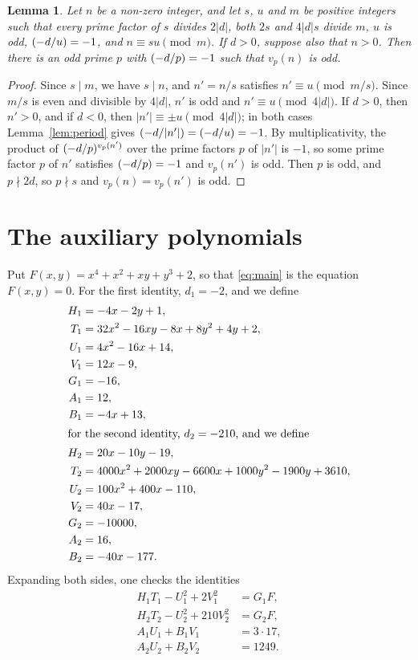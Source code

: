 \documentclass[11pt]{article}
\newtheorem{lemma}[theorem]{Lemma}
\newcommand{\leg}[2]{\mathchoice{\biggl(\dfrac{#1}{#2}\biggr)}{(#1/#2)}{(#1/#2)}{(#1/#2)}}
\begin{document}
\begin{lemma}\label{lem:odd}
Let $n$ be a non-zero integer, and let $s$, $u$ and $m$ be positive integers such that every prime factor of $s$ divides $2|d|$, both $2s$ and $4|d|s$ divide $m$, $u$ is odd, $\leg{-d}{u}=-1$, and $n\equiv su\pmod m$. If $d>0$, suppose also that $n>0$. Then there is an odd prime $p$ with $\leg{-d}{p}=-1$ such that $v_p(n)$ is odd.
\end{lemma}

\begin{proof}
Since $s\mid m$, we have $s\mid n$, and $n'=n/s$ satisfies $n'\equiv u\pmod{m/s}$. Since $m/s$ is even and divisible by $4|d|$, $n'$ is odd and $n'\equiv u\pmod{4|d|}$. If $d>0$, then $n'>0$, and if $d<0$, then $|n'|\equiv\pm u\pmod{4|d|}$; in both cases Lemma~\ref{lem:period} gives $\leg{-d}{|n'|}=\leg{-d}{u}=-1$. By multiplicativity, the product of $\leg{-d}{p}^{v_p(n')}$ over the prime factors $p$ of $|n'|$ is $-1$, so some prime factor $p$ of $n'$ satisfies $\leg{-d}{p}=-1$ and $v_p(n')$ is odd. Then $p$ is odd, and $p\nmid2d$, so $p\nmid s$ and $v_p(n)=v_p(n')$ is odd.
\end{proof}

\section{The auxiliary polynomials}

Put $F(x,y)=x^{4}+x^{2}+xy+y^{3}+2$, so that \eqref{eq:main} is the equation $F(x,y)=0$.
For the first identity, $d_{1}=-2$, and we define
\begin{align*}
H_{1}&=-4x-2y+1,\\
T_{1}&=32x^{2}-16xy-8x+8y^{2}+4y+2,\\
U_{1}&=4x^{2}-16x+14,\\
V_{1}&=12x-9,\\
G_{1}&=-16,\\
A_{1}&=12,\\
B_{1}&=-4x+13,\\
\intertext{for the second identity, $d_{2}=-210$, and we define}
H_{2}&=20x-10y-19,\\
T_{2}&=4000x^{2}+2000xy-6600x+1000y^{2}-1900y+3610,\\
U_{2}&=100x^{2}+400x-110,\\
V_{2}&=40x-17,\\
G_{2}&=-10000,\\
A_{2}&=16,\\
B_{2}&=-40x-177.
\end{align*}
Expanding both sides, one checks the identities
\begin{align}
H_{1}T_{1}-U_{1}^2+2V_{1}^2&=G_{1}F,\label{eq:norm1}\\
H_{2}T_{2}-U_{2}^2+210V_{2}^2&=G_{2}F,\label{eq:norm2}\\
A_{1}U_{1}+B_{1}V_{1}&=3\cdot 17,\label{eq:bez1}\\
A_{2}U_{2}+B_{2}V_{2}&=1249.\label{eq:bez2}
\end{align}
\end{document}
